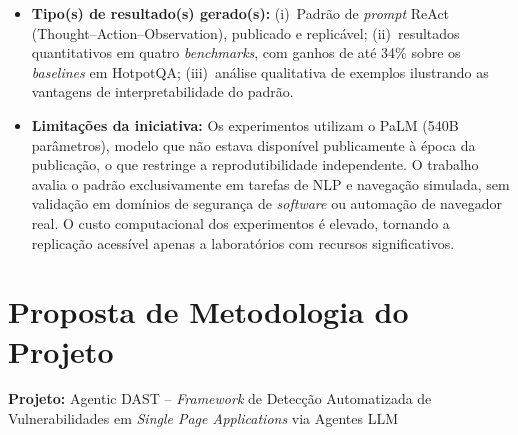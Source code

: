 \documentclass[12pt, a4paper]{article}
\begin{document}
\begin{itemize}
\begin{itemize}
    \item[(f)] \textbf{Tipo(s) de resultado(s) gerado(s):}
    (i)~Padrão de \textit{prompt} ReAct (Thought--Action--Observation), publicado e replicável;
    (ii)~resultados quantitativos em quatro \textit{benchmarks}, com ganhos de até 34\% sobre os \textit{baselines} em HotpotQA;
    (iii)~análise qualitativa de exemplos ilustrando as vantagens de interpretabilidade do padrão.

    \item[(g)] \textbf{Limitações da iniciativa:}
    Os experimentos utilizam o PaLM (540B parâmetros), modelo que não estava disponível publicamente à época da publicação, o que restringe a reprodutibilidade independente.
    O trabalho avalia o padrão exclusivamente em tarefas de NLP e navegação simulada, sem validação em domínios de segurança de \textit{software} ou automação de navegador real.
    O custo computacional dos experimentos é elevado, tornando a replicação acessível apenas a laboratórios com recursos significativos.

  \end{itemize}
\end{itemize}

\section{Proposta de Metodologia do Projeto}

\textbf{Projeto:} Agentic DAST -- \textit{Framework} de Detecção Automatizada de Vulnerabilidades em \textit{Single Page Applications} via Agentes LLM

\vspace{0.5em}
\end{document}
